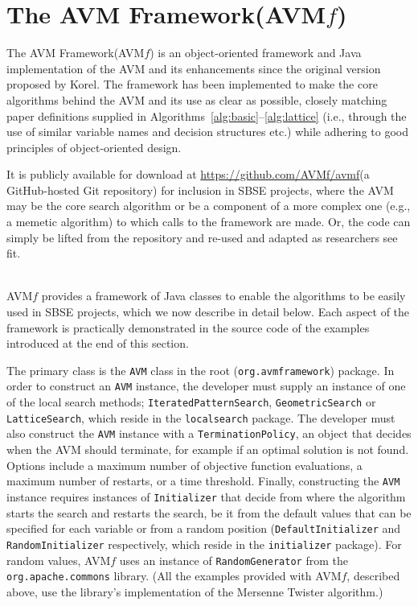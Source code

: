 \documentclass{llncs}
\newcommand{\longname}{AVM Framework\xspace}
\newcommand{\name}{AVM\hspace{-1pt}$f$\xspace}
\newcommand{\repourl}{\url{https://github.com/AVMf/avmf}\xspace}
\newcommand{\inlineheading}[1]{\vspace{1ex} \noindent {\bf #1.}}
\begin{document}
\section{The \longname (\name)}
\label{sec:avmf}
The \longname (\name) is an object-oriented framework and Java implementation of the AVM and its enhancements since the original version proposed by Korel.  The framework has been implemented to make the core algorithms behind the AVM and its use as clear as possible, closely matching paper definitions supplied in Algorithms~\ref{alg:basic}--\ref{alg:lattice} (i.e., through the use of similar variable names and decision structures etc.) while adhering to good principles of object-oriented design.

It is publicly available for download at \repourl (a GitHub-hosted Git repository) for inclusion in SBSE projects, where the AVM may be the core search algorithm or be a component of a more complex one (e.g., a memetic algorithm) to which calls to the framework are made. Or, the code can simply be lifted from the repository and re-used and adapted as researchers see fit.

~\\
\name provides a framework of Java classes to enable the algorithms to be easily used in SBSE projects, which we now describe in detail below. Each aspect of the framework is practically demonstrated in the source code of the examples introduced at the end of this section.

\begin{sloppypar}
\inlineheading{Configuring an AVM search} The primary class is the {\tt AVM} class in the root ({\tt org.avmframework}) package. In order to construct an {\tt AVM} instance, the developer must supply an instance of one of the local search methods; {\tt IteratedPatternSearch}, {\tt GeometricSearch} or {\tt LatticeSearch}, which reside in the {\tt localsearch} package. The developer must also construct the {\tt AVM} instance with a {\tt TerminationPolicy}, an object that decides when the AVM should terminate, for example if an optimal solution is not found. Options include a maximum number of objective function evaluations, a maximum number of restarts, or a time threshold. Finally, constructing the {\tt AVM} instance requires instances of {\tt Initializer} that decide from where the algorithm starts the search and restarts the search, be it from the default values that can be specified for each variable or from a random position ({\tt DefaultInitializer} and {\tt RandomInitializer} respectively, which reside in the {\tt initializer} package). For random values, \name uses an instance of {\tt RandomGenerator} from the {\tt org.apache.commons} library. (All the examples provided with \name, described above, use the library's implementation of the Mersenne Twister algorithm.)
\end{sloppypar}
\end{document}
